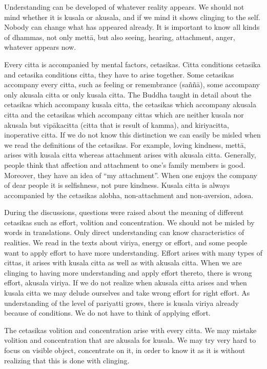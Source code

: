 {{{{{{{{{{{Understanding can be developed of
whatever reality appears. We should not mind whether it is kusala or
akusala, and if we mind it shows clinging to the self. Nobody can change
what has appeared already. It is important to know all kinds of dhammas,
not only mettā, but also seeing, hearing, attachment, anger, whatever
appears now.

Every citta is accompanied by mental
factors, cetasikas. Citta conditions cetasika and cetasika conditions
citta, they have to arise together. Some cetasikas accompany every
citta, such as feeling or remembrance (saññā), some accompany only
akusala citta or only kusala citta. The Buddha taught in detail about
the cetasikas which accompany kusala citta, the cetasikas which
accompany akusala citta and the cetasikas which accompany cittas which
are neither kusala nor akusala but vipākacitta (citta that is result of
kamma), and kiriyacitta, inoperative citta. If we do not know this
distinction we can easily be misled when we read the definitions of the
cetasikas. For example, loving kindness, mettā, arises with kusala citta
whereas attachment arises with akusala citta. Generally, people think
that affection and attachment to one's family members is good. Moreover,
they have an idea of ``my attachment''. When one enjoys the company of
dear people it is selfishness, not pure kindness. Kusala citta is always
accompanied by the cetasikas alobha, non-attachment and non-aversion,
adosa. 

During the discussions, questions were
raised about the meaning of different cetasikas such as effort, volition
and concentration. We should not be misled by words in translations.
Only direct understanding can know characteristics of realities. We read
in the texts about viriya, energy or effort, and some people want to
apply effort to have more understanding. Effort arises with many types
of cittas, it arises with kusala citta as well as with akusala citta.
When we are clinging to having more understanding and apply effort
thereto, there is wrong effort, akusala viriya. If we do not realize
when akusala citta arises and when kusala citta we may delude ourselves
and take wrong effort for right effort. As understanding of the level of
pariyatti grows, there is kusala viriya already because of conditions.
We do not have to think of applying effort. 

The cetasikas volition and
concentration arise with every citta. We may mistake volition and
concentration that are akusala for kusala. We may try very hard to focus
on visible object, concentrate on it, in order to know it as it is
without realizing that this is done with clinging. 

}}}}}}}}}}}
